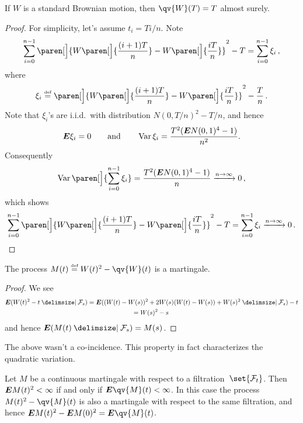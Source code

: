 \begin{proposition}
  If $W$ is a standard Brownian motion, then $\qv{W}(T) = T$ almost surely.
\end{proposition}
\begin{proof}
  For simplicity, let's assume $t_i = Ti/n$.
  Note
  \begin{equation*}
    \sum_{i=0}^{n-1}
      \paren[\Big]{
	W\paren[\Big]{\frac{(i+1)T}{n}}
	- W\paren[\Big]{\frac{iT}{n}}
      }^2 - T
      = \sum_{i=0}^{n-1}
	  \xi_i\,,
  \end{equation*}
  where
  \begin{equation*}
    \xi_i \defeq
	    \paren[\Big]{
	      W\paren[\Big]{\frac{(i+1)T}{n}}
	      - W\paren[\Big]{\frac{iT}{n}}
	    }^2 - \frac{T}{n}\,.
  \end{equation*}
  Note that $\xi_i$'s are i.i.d.\ with distribution $N(0, T/n)^2 - T/n$, and hence
  \begin{equation*}
    \bm{E} \xi_i = 0
    \qquad\text{and}\qquad
    \operatorname{Var} \xi_i = \frac{T^2 (\bm{E} N(0,1)^4 - 1)}{n^2}.
  \end{equation*}
  Consequently
  \begin{equation*}
    \var\paren[\Big]{
      \sum_{i=0}^{n-1} \xi_i
    } = \frac{T^2 (\E N(0,1)^4 - 1)}{n} \xrightarrow{n \to \infty} 0\,,
  \end{equation*}
  which shows
  \begin{equation*}
    \sum_{i=0}^{n-1}
      \paren[\Big]{
	W\paren[\Big]{\frac{(i+1)T}{n}}
	- W\paren[\Big]{\frac{iT}{n}}
      }^2 - T
      = \sum_{i=0}^{n-1}
	  \xi_i
      \xrightarrow{n \to \infty} 0 \,.
      \qedhere
  \end{equation*}
\end{proof}

\begin{corollary}
  The process $M(t) \defeq W(t)^2 - \qv{W}(t)$ is a martingale.
\end{corollary}
\begin{proof}
  We see
  \begin{multline*}
    \E( W(t)^2 - t \given \mathcal F_s )
      = \E ( (W(t) - W(s))^2  + 2 W(s) (W(t) - W(s)) + W(s)^2 \given \mathcal F_s ) - t
      \\
      = W(s)^2 - s\,
  \end{multline*}
  and hence $\E (M(t) \given \mathcal F_s ) = M(s)$.
\end{proof}

The above wasn't a co-incidence.
This property in fact characterizes the quadratic variation.
\begin{theorem}\label{t:3qv1}
  Let $M$ be a continuous martingale with respect to a filtration~$\set{\mathcal F_t}$.
  Then $\bm{E} M(t)^2 < \infty$ if and only if $\E \qv{M}(t) < \infty$.
  In this case the process $M(t)^2 - \qv{M}(t)$ is also a martingale with respect to the same filtration, and hence $\E M(t)^2 - \E M(0)^2 = \E \qv{M}(t)$.
\end{theorem}


